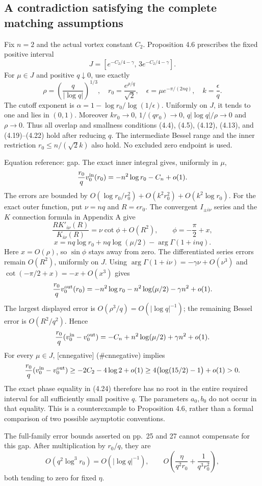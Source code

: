 \documentclass[10pt]{article}
\begin{document}
\subsection*{A contradiction satisfying the complete matching assumptions}
Fix \(n=2\) and the actual vortex constant \(C_2\). Proposition 4.6 prescribes the fixed positive interval \[J=\left[e^{-C_2/4-\gamma},\,3e^{-C_2/4-\gamma}\right].\] For \(\mu\in J\) and positive \(q\downarrow0\), use exactly \[\rho=\left(\frac q{|\log q|}\right)^{1/3},\quad
 r_0=\frac{e^{\rho/q}}{\sqrt2},\quad
 \epsilon=\mu e^{-\pi/(2nq)},\quad k=\frac{\epsilon}{q}.\] The cutoff exponent is \(\alpha=1-\log r_0/\log(1/\epsilon)\). Uniformly on \(J\), it tends to one and lies in \((0,1)\). Moreover \(kr_0\to0\), \(1/(qr_0)\to0\), \(q|\log q|/\rho\to0\) and \(\rho\to0\). Thus all overlap and smallness conditions (4.4), (4.5), (4.12), (4.13), and (4.19)–(4.22) hold after reducing \(q\). The intermediate Bessel range and the inner restriction \(r_0\le n/(\sqrt2 k)\) also hold. No excluded zero endpoint is used.\par
Equation reference: gap. The exact inner integral gives, uniformly in \(\mu\), \[\frac{r_0}{q}v_0^{\rm in}(r_0)
   =-n^2\log r_0-C_n+o(1).\] The errors are bounded by \(O(\log r_0/r_0^2)+O(k^2r_0^2)+O(k^2\log r_0)\). For the exact outer function, put \(\nu=nq\) and \(R=\epsilon r_0\). The convergent \(I_{\pm i\nu}\) series and the \(K\) connection formula in Appendix A give \[\frac{RK'_{i\nu}(R)}{K_{i\nu}(R)}
    =\nu\cot\phi+O(R^2),\qquad \phi=-\frac\pi2+x,\] \[x=nq\log r_0+nq\log(\mu/2)-\arg\Gamma(1+inq).\] Here \(x=O(\rho)\), so \(\sin\phi\) stays away from zero. The differentiated series errors remain \(O(R^2)\), uniformly on \(J\). Using \(\arg\Gamma(1+i\nu)=-\gamma\nu+O(\nu^3)\) and \(\cot(-\pi/2+x)=-x+O(x^3)\) gives \[\frac{r_0}{q}v_0^{\rm out}(r_0)
 =-n^2\log r_0-n^2\log(\mu/2)-\gamma n^2+o(1).\] The largest displayed error is \(O(\rho^3/q)=O(|\log q|^{-1})\); the remaining Bessel error is \(O(R^2/q^2)\). Hence \[
 \frac{r_0}{q}(v_0^{\rm in}-v_0^{\rm out})
 =-C_n+n^2\log(\mu/2)+\gamma n^2+o(1).\] For every \(\mu\in J\), [cnnegative] (\#cnnegative) implies \[\frac{r_0}{q}(v_0^{\rm in}-v_0^{\rm out})
 \ge-2C_2-4\log2+o(1)
 \ge4\bigl(\log(15/2)-1\bigr)+o(1)>0.\] The exact phase equality in (4.24) therefore has no root in the entire required interval for all sufficiently small positive \(q\). The parameters \(a_0,b_0\) do not occur in that equality. This is a counterexample to Proposition 4.6, rather than a formal comparison of two possible asymptotic conventions.\par
The full-family error bounds asserted on pp. 25 and 27 cannot compensate for this gap. After multiplication by \(r_0/q\), they are \[O(q^2\log^3r_0)=O(|\log q|^{-1}),\qquad
 O\left(\frac{\eta}{q^2r_0}+\frac1{q^3r_0^2}\right),\] both tending to zero for fixed \(\eta\).\par
\end{document}
